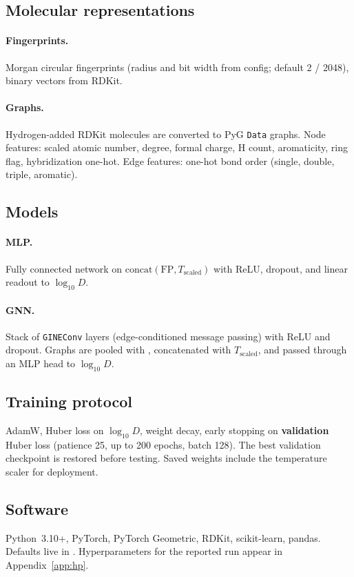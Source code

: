 \documentclass[11pt,a4paper]{article}
\begin{document}
\subsection{Molecular representations}
\paragraph{Fingerprints.} Morgan circular fingerprints (radius and bit width from config; default 2 / 2048), binary vectors from RDKit.

\paragraph{Graphs.} Hydrogen-added RDKit molecules are converted to PyG \texttt{Data} graphs. Node features: scaled atomic number, degree, formal charge, H count, aromaticity, ring flag, hybridization one-hot. Edge features: one-hot bond order (single, double, triple, aromatic).

\subsection{Models}
\paragraph{MLP.} Fully connected network on $\text{concat}(\text{FP}, T_{\text{scaled}})$ with ReLU, dropout, and linear readout to $\log_{10} D$.

\paragraph{GNN.} Stack of \texttt{GINEConv} layers (edge-conditioned message passing) with ReLU and dropout. Graphs are pooled with , concatenated with $T_{\text{scaled}}$, and passed through an MLP head to $\log_{10} D$.

\subsection{Training protocol}
AdamW, Huber loss on $\log_{10} D$, weight decay, early stopping on \textbf{validation} Huber loss (patience 25, up to 200 epochs, batch 128). The best validation checkpoint is restored before testing. Saved weights include the temperature scaler for deployment.

\subsection{Software}
Python~3.10+, PyTorch, PyTorch Geometric, RDKit, scikit-learn, pandas. Defaults live in . Hyperparameters for the reported run appear in Appendix~\ref{app:hp}.
\end{document}

